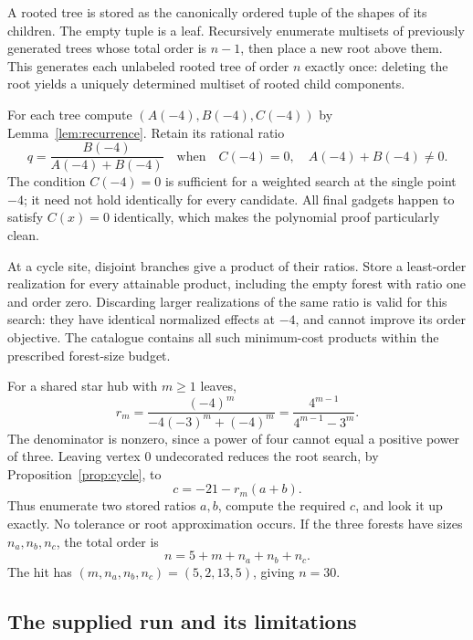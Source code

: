 \documentclass[11pt]{article}
\numberwithin{equation}{section}
\theoremstyle{definition}
\begin{document}
A rooted tree is stored as the canonically ordered tuple of the shapes
of its children. The empty tuple is a leaf. Recursively enumerate
multisets of previously generated trees whose total order is \(n-1\),
then place a new root above them. This generates each unlabeled rooted
tree of order \(n\) exactly once: deleting the root yields a uniquely
determined multiset of rooted child components.

For each tree compute \((A(-4),B(-4),C(-4))\) by
Lemma~\ref{lem:recurrence}. Retain its rational ratio
\[
 q=\frac{B(-4)}{A(-4)+B(-4)}
 \quad\text{when}\quad C(-4)=0,\quad A(-4)+B(-4)\ne0.
\]
The condition \(C(-4)=0\) is sufficient for a weighted search at the
single point \(-4\); it need not hold identically for every candidate.
All final gadgets happen to satisfy \(C(x)=0\) identically, which
makes the polynomial proof particularly clean.

At a cycle site, disjoint branches give a product of their ratios.
Store a least-order realization for every attainable product, including
the empty forest with ratio one and order zero. Discarding larger
realizations of the same ratio is valid for this search: they have
identical normalized effects at \(-4\), and cannot improve its order
objective. The catalogue contains all such minimum-cost products within
the prescribed forest-size budget.

For a shared star hub with \(m\ge1\) leaves,
\begin{equation}\label{eq:hubratio}
 r_m=\frac{(-4)^m}{-4(-3)^m+(-4)^m}
     =\frac{4^{m-1}}{4^{m-1}-3^m}.
\end{equation}
The denominator is nonzero, since a power of four cannot equal a
positive power of three. Leaving vertex \(0\) undecorated reduces the
root search, by Proposition~\ref{prop:cycle}, to
\begin{equation}\label{eq:searchtarget}
 c=-21-r_m(a+b).
\end{equation}
Thus enumerate two stored ratios \(a,b\), compute the required \(c\),
and look it up exactly. No tolerance or root approximation occurs.
If the three forests have sizes \(n_a,n_b,n_c\), the total order is
\begin{equation}\label{eq:cost}
 n=5+m+n_a+n_b+n_c.
\end{equation}
The hit has \((m,n_a,n_b,n_c)=(5,2,13,5)\), giving \(n=30\).

\subsection{The supplied run and its limitations}
\end{document}
